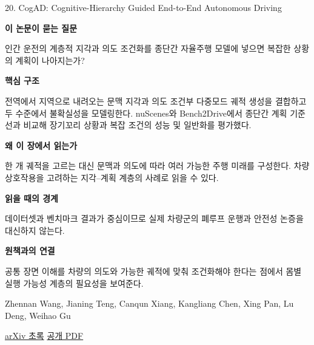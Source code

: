 \documentclass[11pt,openany]{book}
\begin{document}
\begin{termcard}{20. CogAD: Cognitive-Hierarchy Guided End-to-End Autonomous Driving}

\par

\medskip

{\sffamily\bfseries\color{deepblue} 이 논문이 묻는 질문}\par

인간 운전의 계층적 지각과 의도 조건화를 종단간 자율주행 모델에 넣으면 복잡한 상황의 계획이 나아지는가?

\smallskip

{\sffamily\bfseries\color{deepblue} 핵심 구조}\par

전역에서 지역으로 내려오는 문맥 지각과 의도 조건부 다중모드 궤적 생성을 결합하고 두 수준에서 불확실성을 모델링한다. nuScenes와 Bench2Drive에서 종단간 계획 기준선과 비교해 장기꼬리 상황과 복잡 조건의 성능 및 일반화를 평가했다.

\smallskip

{\sffamily\bfseries\color{deepblue} 왜 이 장에서 읽는가}\par

한 개 궤적을 고르는 대신 문맥과 의도에 따라 여러 가능한 주행 미래를 구성한다. 차량 상호작용을 고려하는 지각–계획 계층의 사례로 읽을 수 있다.

\smallskip

{\sffamily\bfseries\color{coral} 읽을 때의 경계}\par

데이터셋과 벤치마크 결과가 중심이므로 실제 차량군의 폐루프 운행과 안전성 논증을 대신하지 않는다.

\smallskip

{\sffamily\bfseries\color{teal} 원책과의 연결}\par

공통 장면 이해를 차량의 의도와 가능한 궤적에 맞춰 조건화해야 한다는 점에서 몸별 실행 가능성 계층의 필요성을 보여준다.

\medskip

{\footnotesize\color{muted} Zhennan Wang, Jianing Teng, Canqun Xiang, Kangliang Chen, Xing Pan, Lu Deng, Weihao Gu\par

\href{https://arxiv.org/abs/2505.21581}{arXiv 초록} \quad \href{https://arxiv.org/pdf/2505.21581}{공개 PDF}\par}

\end{termcard}
\end{document}
